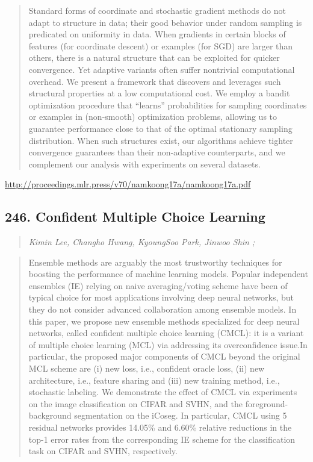 \documentclass{article}
\begin{document}
\begin{quote}
    Standard forms of coordinate and stochastic gradient methods do not adapt to structure in data; their good behavior under random sampling is predicated on uniformity in data. When gradients in certain blocks of features (for coordinate descent) or examples (for SGD) are larger than others, there is a natural structure that can be exploited for quicker convergence. Yet adaptive variants often suffer nontrivial computational overhead. We present a framework that discovers and leverages such structural properties at a low computational cost. We employ a bandit optimization procedure that “learns” probabilities for sampling coordinates or examples in (non-smooth) optimization problems, allowing us to guarantee performance close to that of the optimal stationary sampling distribution. When such structures exist, our algorithms achieve tighter convergence guarantees than their non-adaptive counterparts, and we complement our analysis with experiments on several datasets.  
\end{quote}

\href{http://proceedings.mlr.press/v70/namkoong17a/namkoong17a.pdf}{http://proceedings.mlr.press/v70/namkoong17a/namkoong17a.pdf}

\subsection{246. Confident Multiple Choice Learning}

\begin{quote}
\footnotesize{\textit{Kimin Lee, Changho Hwang, KyoungSoo Park, Jinwoo Shin ;}}

\end{quote}

\begin{quote}
    Ensemble methods are arguably the most trustworthy techniques for boosting the performance of machine learning models. Popular independent ensembles (IE) relying on naive averaging/voting scheme have been of typical choice for most applications involving deep neural networks, but they do not consider advanced collaboration among ensemble models. In this paper, we propose new ensemble methods specialized for deep neural networks, called confident multiple choice learning (CMCL): it is a variant of multiple choice learning (MCL) via addressing its overconfidence issue.In particular, the proposed major components of CMCL beyond the original MCL scheme are (i) new loss, i.e., confident oracle loss, (ii) new architecture, i.e., feature sharing and (iii) new training method, i.e., stochastic labeling. We demonstrate the effect of CMCL via experiments on the image classification on CIFAR and SVHN, and the foreground-background segmentation on the iCoseg. In particular, CMCL using 5 residual networks provides 14.05\% and 6.60\% relative reductions in the top-1 error rates from the corresponding IE scheme for the classification task on CIFAR and SVHN, respectively.  
\end{quote}
\end{document}
